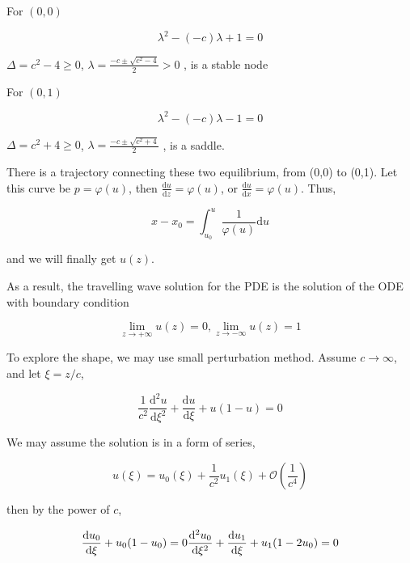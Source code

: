 \documentclass[
]{article}
\begin{document}
For $(0,0)$

\begin{equation*}
\lambda ^ 2 -(-c) \lambda + 1 = 0
\end{equation*}

$\Delta = c^2 - 4 \geq 0$,
$\lambda = \frac{-c \pm \sqrt{c^2 - 4}}{2} > 0$ , is a stable node

For $(0,1)$

\begin{equation*}
\lambda ^ 2 - (-c) \lambda - 1 = 0
\end{equation*}

$\Delta = c^2 + 4 \geq 0$,
$\lambda = \frac{-c \pm \sqrt{c^2 + 4}}{2}$ , is a saddle.

There is a trajectory connecting these two equilibrium, from (0,0) to
(0,1). Let this curve be $p = \varphi (u)$, then
$\frac{\mathrm{d} u}{\mathrm{d} z}= \varphi (u)$, or
$\frac{\mathrm{d} u}{\mathrm{d} x} = \varphi(u)$. Thus,

\begin{equation*}
x - x_{0} = \int_{u_{0}}^{u} \frac{1}{\varphi(u)} \mathrm{d}u
\end{equation*}

and we will finally get $u(z)$.

As a result, the travelling wave solution for the PDE is the solution of
the ODE with boundary condition

\begin{equation*}
\lim_{z \rightarrow +\infty} u(z) = 0, \lim_{z \rightarrow -\infty} u(z) = 1
\end{equation*}

To explore the shape, we may use small perturbation method. Assume
$c \rightarrow \infty$, and let $\xi = z/c$,

\begin{equation*}
\frac{1}{c^2} \frac{\mathrm{d}^2 u}{\mathrm{d} \xi^2} + \frac{\mathrm{d} u}{\mathrm{d} \xi} + u(1-u) = 0
\end{equation*}

We may assume the solution is in a form of series,

\begin{equation*}
u(\xi) = u_{0}(\xi) + \frac{1}{c^2}u_{1}(\xi) + \mathcal{O}(\frac{1}{c^4})
\end{equation*}

then by the power of $c$,

\begin{equation*}
\frac{\mathrm{d} u_{0}}{\mathrm{d} \xi} + u_{0}(1-u_{0}) = 0\\
\frac{\mathrm{d}^2 u_{0}}{\mathrm{d} \xi^2} + \frac{\mathrm{d} u_{1}}{\mathrm{d} \xi} + u_{1}( 1 - 2 u_{0} ) = 0
\end{equation*}
\end{document}
